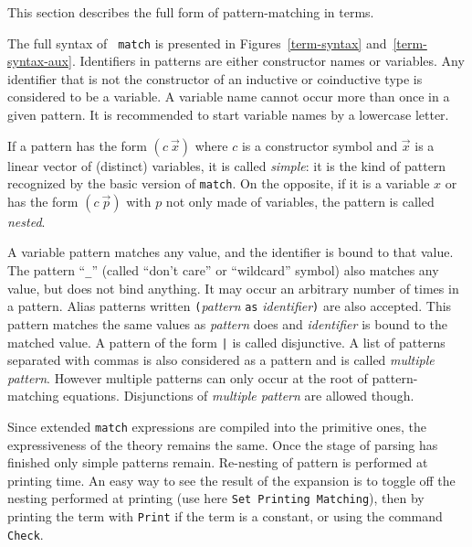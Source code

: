 
\label{Mult-match-full}

This section describes the full form of pattern-matching in {\Coq} terms.

\label{implementation} The full syntax of {\tt
match} is presented in Figures~\ref{term-syntax}
and~\ref{term-syntax-aux}.  Identifiers in patterns are either
constructor names or variables. Any identifier that is not the
constructor of an inductive or coinductive type is considered to be a
variable. A variable name cannot occur more than once in a given
pattern. It is recommended to start variable names by a lowercase
letter.

If a pattern has the form $(c~\vec{x})$ where $c$ is a constructor
symbol and $\vec{x}$ is a linear vector of (distinct) variables, it is
called {\em simple}: it is the kind of pattern recognized by the basic
version of {\tt match}. On the opposite, if it is a variable $x$ or
has the form $(c~\vec{p})$ with $p$ not only made of variables, the
pattern is called {\em nested}.

A variable pattern matches any value, and the identifier is bound to
that value. The pattern ``\texttt{\_}'' (called ``don't care'' or
``wildcard'' symbol) also matches any value, but does not bind
anything. It may occur an arbitrary number of times in a
pattern. Alias patterns written \texttt{(}{\sl pattern} \texttt{as}
{\sl identifier}\texttt{)} are also accepted. This pattern matches the
same values as {\sl pattern} does and {\sl identifier} is bound to the
matched value.  
A pattern of the form {\pattern}{\tt |}{\pattern} is called
disjunctive. A list of patterns separated with commas is also
considered as a pattern and is called {\em multiple pattern}. However
multiple patterns can only occur at the root of pattern-matching
equations. Disjunctions of {\em multiple pattern} are allowed though.

Since extended {\tt match} expressions are compiled into the primitive
ones, the expressiveness of the theory remains the same. Once the
stage of parsing has finished only simple patterns remain.  Re-nesting
of pattern is performed at printing time. An easy way to see the
result of the expansion is to toggle off the nesting performed at
printing (use here {\tt Set Printing Matching}), then by printing the term
with \texttt{Print} if the term is a constant, or using the command
\texttt{Check}.

